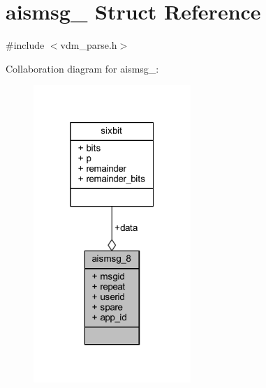 \hypertarget{structaismsg__8}{}\section{aismsg\+\_ Struct Reference}
\label{structaismsg__8}


{\ttfamily \#include $<$vdm\+\_\+parse.\+h$>$}



Collaboration diagram for aismsg\+\_\+:
\nopagebreak
\begin{figure}[H]
\begin{center}
\leavevmode
\includegraphics[width=169pt]{structaismsg__8__coll__graph}
\end{center}
\end{figure}
